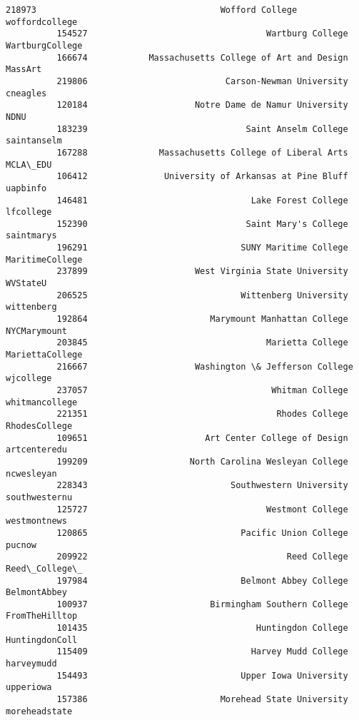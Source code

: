 \documentclass[11pt]{article}
\begin{document}
\begin{Verbatim}[commandchars=\\\{\}]
          218973                                    Wofford College   woffordcollege   
          154527                                   Wartburg College  WartburgCollege   
          166674            Massachusetts College of Art and Design          MassArt   
          219806                           Carson-Newman University         cneagles   
          120184                     Notre Dame de Namur University             NDNU   
          183239                               Saint Anselm College      saintanselm   
          167288              Massachusetts College of Liberal Arts         MCLA\_EDU   
          106412               University of Arkansas at Pine Bluff         uapbinfo   
          146481                                Lake Forest College        lfcollege   
          152390                               Saint Mary's College       saintmarys   
          196291                              SUNY Maritime College  MaritimeCollege   
          237899                     West Virginia State University         WVStateU   
          206525                              Wittenberg University       wittenberg   
          192864                        Marymount Manhattan College     NYCMarymount   
          203845                                   Marietta College  MariettaCollege   
          216667                     Washington \& Jefferson College        wjcollege   
          237057                                    Whitman College   whitmancollege   
          221351                                     Rhodes College    RhodesCollege   
          109651                       Art Center College of Design     artcenteredu   
          199209                    North Carolina Wesleyan College       ncwesleyan   
          228343                            Southwestern University    southwesternu   
          125727                                   Westmont College     westmontnews   
          120865                              Pacific Union College           pucnow   
          209922                                       Reed College    Reed\_College\_   
          197984                              Belmont Abbey College     BelmontAbbey   
          100937                        Birmingham Southern College   FromTheHilltop   
          101435                                 Huntingdon College   HuntingdonColl   
          115409                                Harvey Mudd College       harveymudd   
          154493                              Upper Iowa University        upperiowa   
          157386                          Morehead State University    moreheadstate   

\end{Verbatim}
\end{document}
